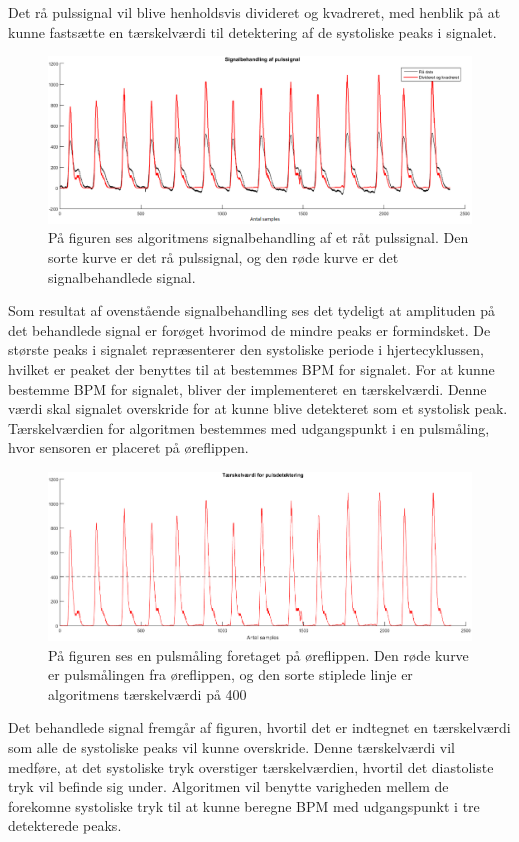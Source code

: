{Det rå pulssignal vil blive henholdsvis divideret og kvadreret, med henblik på at kunne fastsætte en tærskelværdi til detektering af de systoliske peaks i signalet. 
\begin{figure}[H]
	\centering
	\includegraphics[scale=0.46]{figures/cDesign/puls_ore_behandlet.png}
	\caption{På figuren ses algoritmens signalbehandling af et råt pulssignal. Den sorte kurve er det rå pulssignal, og den røde kurve er det signalbehandlede signal.}
	\label{fig:behandlet_puls}
\end{figure}
Som resultat af ovenstående signalbehandling ses det tydeligt at amplituden på det behandlede signal er forøget hvorimod de mindre peaks er formindsket. De største peaks i signalet repræsenterer den systoliske periode i hjertecyklussen, hvilket er peaket der benyttes til at bestemmes BPM for signalet. For at kunne bestemme BPM for signalet, bliver der implementeret en tærskelværdi. Denne værdi skal signalet overskride for at kunne blive detekteret som et systolisk peak. Tærskelværdien for algoritmen bestemmes med udgangspunkt i en pulsmåling, hvor sensoren er placeret på øreflippen.
\begin{figure}[H]
	\centering
	\includegraphics[scale=0.46]{figures/cDesign/puls_taerskel.png}
	\caption{På figuren ses en pulsmåling foretaget på øreflippen. Den røde kurve er pulsmålingen fra øreflippen, og den sorte stiplede linje er algoritmens tærskelværdi på 400}
	\label{fig:taerskel_puls}
\end{figure}
Det behandlede signal fremgår af figuren, hvortil det er indtegnet en tærskelværdi som alle de systoliske peaks vil kunne overskride. Denne tærskelværdi vil medføre, at det systoliske tryk overstiger tærskelværdien, hvortil det diastoliste tryk vil befinde sig under. Algoritmen vil benytte varigheden mellem de forekomne systoliske tryk til at kunne beregne BPM med udgangspunkt i tre detekterede peaks. 

}
